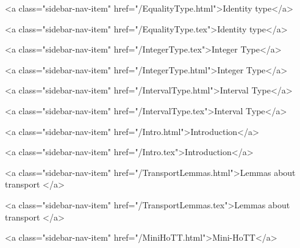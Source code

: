       
        
          <a class="sidebar-nav-item" href="/EqualityType.html">Identity type</a>
        
      
    
      
        
          <a class="sidebar-nav-item" href="/EqualityType.tex">Identity type</a>
        
      
    
      
        
          <a class="sidebar-nav-item" href="/IntegerType.tex">Integer Type</a>
        
      
    
      
        
          <a class="sidebar-nav-item" href="/IntegerType.html">Integer Type</a>
        
      
    
      
        
          <a class="sidebar-nav-item" href="/IntervalType.html">Interval Type</a>
        
      
    
      
        
          <a class="sidebar-nav-item" href="/IntervalType.tex">Interval Type</a>
        
      
    
      
        
          <a class="sidebar-nav-item" href="/Intro.html">Introduction</a>
        
      
    
      
        
          <a class="sidebar-nav-item" href="/Intro.tex">Introduction</a>
        
      
    
      
        
          <a class="sidebar-nav-item" href="/TransportLemmas.html">Lemmas about transport </a>
        
      
    
      
        
          <a class="sidebar-nav-item" href="/TransportLemmas.tex">Lemmas about transport </a>
        
      
    
      
        
          <a class="sidebar-nav-item" href="/MiniHoTT.html">Mini-HoTT</a>
        
      
    
